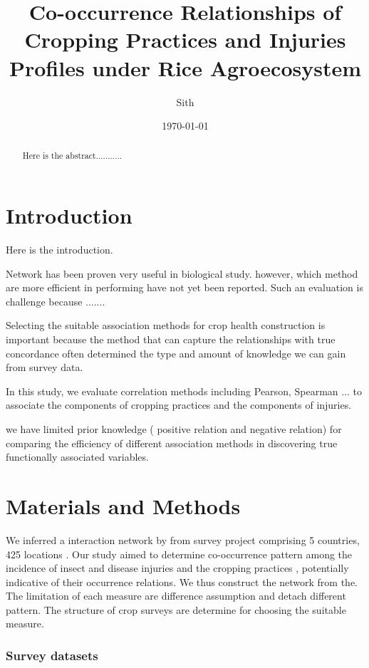 \documentclass[a4paper]{article}
\title{Co-occurrence Relationships of Cropping Practices and Injuries Profiles under Rice Agroecosystem}
\author{Sith}
\date{\today}
\begin{document}
\maketitle

\begin{abstract}
Here is the abstract...........
\end{abstract}

\section{Introduction}

Here is the introduction.

Network has been proven very useful in biological study. however, which method are more efficient in performing have not yet been reported. Such an evaluation is challenge because .......

Selecting the suitable association methods for crop health construction is important because the method that can capture the relationships with true concordance often determined the type and amount of knowledge we can gain from survey data.

In this study, we evaluate correlation methods including Pearson, Spearman ... to associate the components of cropping practices and the components of injuries.

we have limited prior knowledge ( positive relation and negative relation) for comparing the efficiency of different association methods in discovering true functionally associated variables. 

\section{Materials and Methods}
We inferred a interaction network by  from survey project comprising 5 countries, 425 locations . Our study aimed to determine co-occurrence pattern among the incidence of insect and disease injuries and the cropping practices  , potentially indicative of their occurrence relations. We thus construct the network from the. The limitation of each measure are difference assumption and detach different pattern. The structure of crop surveys are determine for choosing the suitable measure. 

\subsubsection{Survey datasets}
\end{document}
